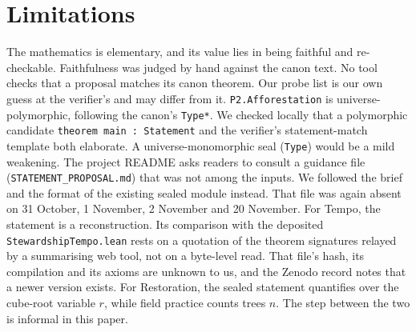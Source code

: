 \documentclass[11pt]{article}
\theoremstyle{definition}
\theoremstyle{remark}
\begin{document}
\section{Limitations}
The mathematics is elementary, and its value lies in being faithful and re-checkable.
Faithfulness was judged by hand against the canon text. No tool checks that a proposal matches its canon theorem.
Our probe list is our own guess at the verifier's and may differ from it.
\texttt{P2.Afforestation} is universe-polymorphic, following the canon's \texttt{Type*}. We checked locally that a polymorphic
candidate \texttt{theorem main : Statement} and the verifier's statement-match template both elaborate.
A universe-monomorphic seal (\texttt{Type}) would be a mild weakening.
The project README asks readers to consult a guidance file (\texttt{STATEMENT\_PROPOSAL.md}) that was not among the inputs.
We followed the brief and the format of the existing sealed module instead. That file was again absent on 31 October, 1 November, 2 November and 20 November.
For Tempo, the statement is a reconstruction. Its comparison with the deposited \texttt{StewardshipTempo.lean} rests on a
quotation of the theorem signatures relayed by a summarising web tool, not on a byte-level read. That file's hash, its
compilation and its axioms are unknown to us, and the Zenodo record notes that a newer version exists.
For Restoration, the sealed statement quantifies over the cube-root variable $r$, while field practice counts trees $n$.
The step between the two is informal in this paper.
\end{document}

